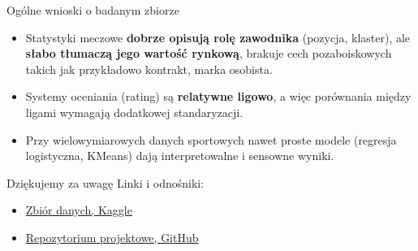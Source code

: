 \documentclass[aspectratio=169]{beamer}
\begin{document}
\begin{frame}{Ogólne wnioski o badanym zbiorze}
    \begin{center}
        \begin{itemize}
            \item Statystyki meczowe \textbf{dobrze opisują rolę zawodnika} (pozycja, klaster), ale \textbf{słabo tłumaczą jego wartość rynkową}, brakuje cech pozaboiskowych takich jak przykładowo kontrakt, marka osobista.
            \item Systemy oceniania (rating) są \textbf{relatywne ligowo}, a więc porównania między ligami wymagają dodatkowej standaryzacji.
            \item Przy wielowymiarowych danych sportowych nawet proste modele (regresja logistyczna, KMeans) dają interpretowalne i sensowne wyniki.
        \end{itemize}
    \end{center}
\end{frame}

\begin{frame}{Dziękujemy za uwagę}
    Linki i odnośniki:
    \begin{itemize}
        \item \href{https://www.kaggle.com/datasets/kaanyorgun/european-top-leagues-player-stats-25-26}{Zbiór danych, Kaggle}
        \item \href{https://github.com/wojciechbukala/FootballPlayersAnalysis}{Repozytorium projektowe, GitHub}
    \end{itemize}
    
\end{frame}
\end{document}

